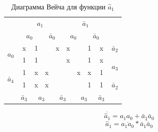\documentclass[a4paper,14pt]{article}
\begin{document}
\begin{table}[H]
				\begin{center}
		\caption{\label{tab:a1_preobr} Диаграмма Вейча для функции $\hat{a}_1$}

		\begin{tabular}{cccccccccc}
			& \multicolumn{4}{c}{$a_1$} & \multicolumn{4}{c}{$\bar{a}_1$} &  \\
			& \multicolumn{2}{c}{$a_0$} & \multicolumn{2}{c}{$\bar{a}_0$} & \multicolumn{2}{c}{$a_0$} & \multicolumn{2}{c}{$\bar{a}_0$} &  \\ \cline{2-9}
			\multicolumn{1}{c|}{\multirow{2}{*}{$a_0$}} & \multicolumn{1}{c|}{x} & \multicolumn{1}{c|}{1} & \multicolumn{1}{c|}{} & \multicolumn{1}{c|}{x} & \multicolumn{1}{c|}{x} & \multicolumn{1}{c|}{} & \multicolumn{1}{c|}{1} & \multicolumn{1}{c|}{x} & $\bar{a}_2$ \\ \cline{2-9}
			\multicolumn{1}{c|}{} & \multicolumn{1}{c|}{1} & \multicolumn{1}{c|}{1} & \multicolumn{1}{c|}{} & \multicolumn{1}{c|}{} & \multicolumn{1}{c|}{x} & \multicolumn{1}{c|}{} & \multicolumn{1}{c|}{1} & \multicolumn{1}{c|}{x} & \multirow{2}{*}{$a_3$} \\ \cline{2-9}
			\multicolumn{1}{c|}{\multirow{2}{*}{$\bar{a}_4$}} & \multicolumn{1}{c|}{1} & \multicolumn{1}{c|}{x} & \multicolumn{1}{c|}{x} & \multicolumn{1}{c|}{} & \multicolumn{1}{c|}{} & \multicolumn{1}{c|}{x} & \multicolumn{1}{c|}{x} & \multicolumn{1}{c|}{1} &  \\ \cline{2-9}
			\multicolumn{1}{c|}{} & \multicolumn{1}{c|}{1} & \multicolumn{1}{c|}{x} & \multicolumn{1}{c|}{x} & \multicolumn{1}{c|}{} & \multicolumn{1}{c|}{} & \multicolumn{1}{c|}{} & \multicolumn{1}{c|}{1} & \multicolumn{1}{c|}{1} & $\bar{a}_2$ \\ \cline{2-9}
			& $\bar{a}_3$ & \multicolumn{2}{c}{$a_3$} & \multicolumn{2}{c}{$\bar{a}_3$} & \multicolumn{2}{c}{$a_3$} & $\bar{a}_3$ & 
		\end{tabular}

\end{center}
\end{table}


$$\overline{\hat{a}_1} = a_1 a_0 + \bar{a}_1\bar{a}_0$$
$$\hat{a}_1 = \overline{a_1 a_0} * \overline{\bar{a}_1\bar{a}_0}$$
\end{document}
